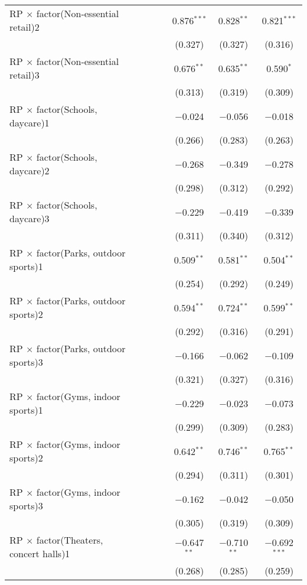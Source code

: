 \begin{table}[!htbp]
\begin{tabular}{@{\extracolsep{5pt}}lcccccc}
  RP $\times$ factor(Non-essential retail)2 &  &  &  & 0.876$^{***}$ & 0.828$^{**}$ & 0.821$^{***}$ \\ 
  &  &  &  & (0.327) & (0.327) & (0.316) \\ 
  RP $\times$ factor(Non-essential retail)3 &  &  &  & 0.676$^{**}$ & 0.635$^{**}$ & 0.590$^{*}$ \\ 
  &  &  &  & (0.313) & (0.319) & (0.309) \\ 
  RP $\times$ factor(Schools, daycare)1 &  &  &  & $-$0.024 & $-$0.056 & $-$0.018 \\ 
  &  &  &  & (0.266) & (0.283) & (0.263) \\ 
  RP $\times$ factor(Schools, daycare)2 &  &  &  & $-$0.268 & $-$0.349 & $-$0.278 \\ 
  &  &  &  & (0.298) & (0.312) & (0.292) \\ 
  RP $\times$ factor(Schools, daycare)3 &  &  &  & $-$0.229 & $-$0.419 & $-$0.339 \\ 
  &  &  &  & (0.311) & (0.340) & (0.312) \\ 
  RP $\times$ factor(Parks, outdoor sports)1 &  &  &  & 0.509$^{**}$ & 0.581$^{**}$ & 0.504$^{**}$ \\ 
  &  &  &  & (0.254) & (0.292) & (0.249) \\ 
  RP $\times$ factor(Parks, outdoor sports)2 &  &  &  & 0.594$^{**}$ & 0.724$^{**}$ & 0.599$^{**}$ \\ 
  &  &  &  & (0.292) & (0.316) & (0.291) \\ 
  RP $\times$ factor(Parks, outdoor sports)3 &  &  &  & $-$0.166 & $-$0.062 & $-$0.109 \\ 
  &  &  &  & (0.321) & (0.327) & (0.316) \\ 
  RP $\times$ factor(Gyms, indoor sports)1 &  &  &  & $-$0.229 & $-$0.023 & $-$0.073 \\ 
  &  &  &  & (0.299) & (0.309) & (0.283) \\ 
  RP $\times$ factor(Gyms, indoor sports)2 &  &  &  & 0.642$^{**}$ & 0.746$^{**}$ & 0.765$^{**}$ \\ 
  &  &  &  & (0.294) & (0.311) & (0.301) \\ 
  RP $\times$ factor(Gyms, indoor sports)3 &  &  &  & $-$0.162 & $-$0.042 & $-$0.050 \\ 
  &  &  &  & (0.305) & (0.319) & (0.309) \\ 
  RP $\times$ factor(Theaters, concert halls)1 &  &  &  & $-$0.647$^{**}$ & $-$0.710$^{**}$ & $-$0.692$^{***}$ \\ 
  &  &  &  & (0.268) & (0.285) & (0.259) \\ 

\end{tabular}
\end{table}
